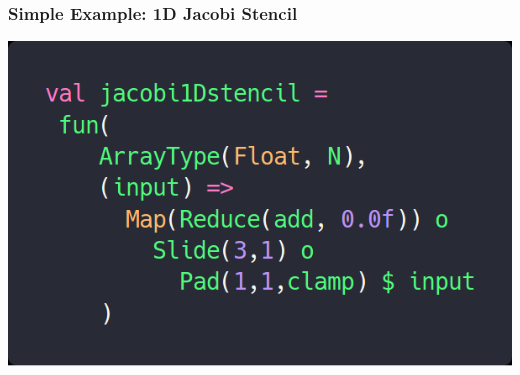 \documentclass[10pt]{beamer}
\begin{document}
\begin{frame}
\frametitle{Simple Example: 1D Jacobi Stencil}
\begin{block}{}
    \begin{center}
    \includegraphics[width=.5\textwidth]{../images/jacobi1Dstencil.png}
    \end{center}
\end{block}
\end{frame}
\end{document}
